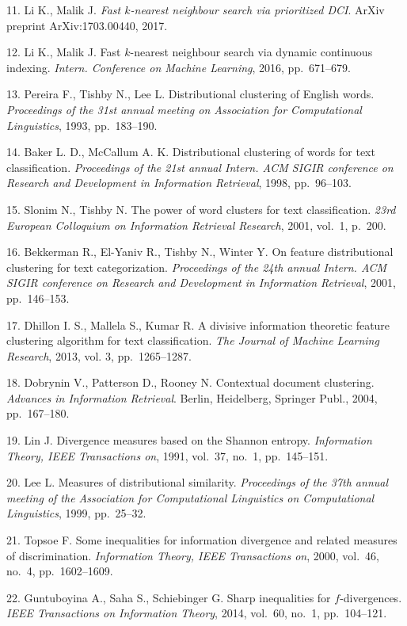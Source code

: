 {11. Li K., Malik J. \textit{Fast $k$-nearest neighbour search via
prioritized DCI}. ArXiv preprint ArXiv:1703.00440, 2017.

12. Li K., Malik J. Fast $k$-nearest neighbour search via dynamic
continuous indexing. \textit{Intern. Conference on Machine
Learning}, 2016, pp.~671--679.

13. Pereira F., Tishby N., Lee L. Distributional clustering of
English words. \textit{Proceedings of the 31st annual meeting on
Association for Computational Linguistics}, 1993, pp.~183--190.

14. Baker L. D., McCallum A. K. Distributional clustering of words
for text classification. \textit{Proceedings of the 21st annual
Intern. ACM SIGIR conference on Research and Development in
Information Retrieval}, 1998, pp.~96--103.

15. Slonim N., Tishby N. The power of word clusters for text
classification. \textit{23rd European Colloquium on Information
Retrieval Research}, 2001, vol.~1, p.~200.

16. Bekkerman R., El-Yaniv R., Tishby N., Winter Y. On feature
distributional clustering for text categorization.
\textit{Proceedings of the 24th annual Intern. ACM SIGIR
conference on Research and Development in Information Retrieval},
2001, pp.~146--153.

17. Dhillon I. S., Mallela S., Kumar R. A divisive information
theoretic feature clustering algorithm for text classification.
\textit{The Journal of Machine Learning Research}, 2013, vol. 3,
pp.~1265--1287.

18. Dobrynin V., Patterson D., Rooney N. Contextual document
clustering. \textit{Advances in Information Retrieval}. Berlin,
Heidelberg, Springer Publ., 2004, pp.~167--180.\\

\newpage

19. Lin J. Divergence measures based on the Shannon entropy.
\textit{Information Theory, IEEE Transactions on}, 1991, vol.~37,
no.~1, pp.~145--151.

20. Lee L. Measures of distributional similarity.
\textit{Proceedings of the 37th annual meeting of the Association
for Computational Linguistics on Computational Linguistics}, 1999,
pp.~25--32.

21. Topsoe F. Some inequalities for information divergence and
related measures of discrimination. \textit{Information Theory,
IEEE Transactions on}, 2000, vol.~46, no.~4, pp.~1602--1609.

22. Guntuboyina A., Saha S., Schiebinger G. Sharp inequalities for
$f$-divergences. \textit{IEEE Transactions on Information Theory},
2014, vol.~60, no.~1, pp.~104--121.

}
